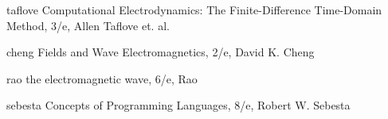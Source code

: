 \cleardoublepage
{}
\begin{thebibliography}{999}
  \bibitem
  {taflove}
  Computational Electrodynamics: The Finite-Difference Time-Domain Method, 3/e, Allen Taflove et. al.

  \bibitem
  {cheng}
  Fields and Wave Electromagnetics, 2/e, David K. Cheng

  \bibitem
  {rao} 
  the electromagnetic wave, 6/e, Rao

  \bibitem
  {sebesta}
  Concepts of Programming Languages, 8/e, Robert W. Sebesta
\end{thebibliography}
